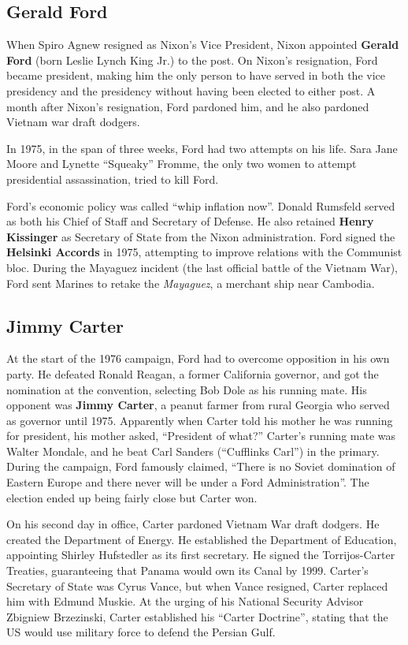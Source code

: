 \subsection*{Gerald Ford}

When Spiro Agnew resigned as Nixon's Vice President,
Nixon appointed \textbf{Gerald Ford} (born Leslie Lynch King Jr.) to the post.
On Nixon's resignation, Ford became president,
making him the only person to have served in both the vice presidency and the presidency
without having been elected to either post.
A month after Nixon's resignation, Ford pardoned him, and he also pardoned Vietnam war draft dodgers.

In 1975, in the span of three weeks, Ford had two attempts on his life.
Sara Jane Moore and Lynette ``Squeaky'' Fromme,
the only two women to attempt presidential assassination, tried to kill Ford.

Ford's economic policy was called ``whip inflation now''.
Donald Rumsfeld served as both his Chief of Staff and Secretary of Defense.
He also retained \textbf{Henry Kissinger} as Secretary of State from the Nixon administration.
Ford signed the \textbf{Helsinki Accords} in 1975, attempting to improve relations with the Communist bloc.
During the Mayaguez incident (the last official battle of the Vietnam War),
Ford sent Marines to retake the \textit{Mayaguez}, a merchant ship near Cambodia.

\subsection*{Jimmy Carter}

At the start of the 1976 campaign, Ford had to overcome opposition in his own party.
He defeated Ronald Reagan, a former California governor, and got the nomination at the convention,
selecting Bob Dole as his running mate.
His opponent was \textbf{Jimmy Carter}, a peanut farmer from rural Georgia who served as governor until 1975.
Apparently when Carter told his mother he was running for president, his mother asked, ``President of what?''
Carter's running mate was Walter Mondale,
and he beat Carl Sanders (``Cufflinks Carl'') in the primary.
During the campaign, Ford famously claimed,
``There is no Soviet domination of Eastern Europe and there never will be under a Ford Administration''.
The election ended up being fairly close but Carter won.

On his second day in office, Carter pardoned Vietnam War draft dodgers.
He created the Department of Energy.
He established the Department of Education, appointing Shirley Hufstedler as its first secretary.
He signed the Torrijos-Carter Treaties, guaranteeing that Panama would own its Canal by 1999.
Carter's Secretary of State was Cyrus Vance, but when Vance resigned,
Carter replaced him with Edmund Muskie.
At the urging of his National Security Advisor Zbigniew Brzezinski, Carter established his ``Carter Doctrine'',
stating that the US would use military force to defend the Persian Gulf.

